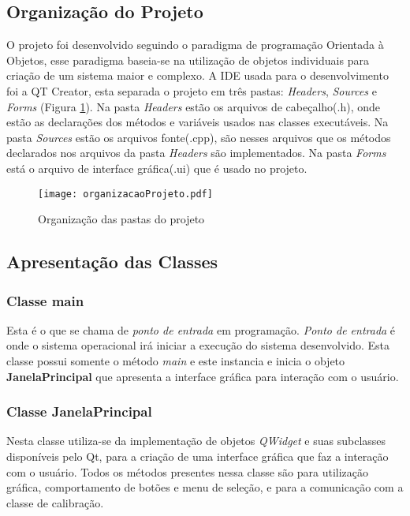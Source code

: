 \subsection{Organização do Projeto}
	 O projeto foi desenvolvido seguindo o paradigma de programação Orientada à Objetos, esse paradigma baseia-se na utilização de objetos individuais para criação de um sistema maior e complexo. A IDE usada para o desenvolvimento foi a QT Creator, esta separada o projeto em três pastas: {\it Headers}, {\it Sources} e {\it Forms} (Figura \ref{fig:OrganizacaoDoProjeto}). Na pasta {\it Headers} estão os arquivos de cabeçalho(.h), onde estão as declarações dos métodos e variáveis usados nas classes  executáveis. Na pasta {\it Sources} estão os arquivos fonte(.cpp), são nesses arquivos que os métodos declarados nos arquivos da pasta {\it Headers} são implementados. Na pasta {\it Forms} está o arquivo de interface gráfica(.ui) que é usado no projeto.
	 
	\begin{figure}[!h]
		\centering
		\texttt{[image: organizacaoProjeto.pdf]}
		\caption{Organização das pastas do projeto}
		\label{fig:OrganizacaoDoProjeto}
	\end{figure}

\subsection{Apresentação das Classes}
\subsubsection{Classe main}
 Esta é o que se chama de \textit{ponto de entrada} em programação. \textit{Ponto de entrada} é onde o sistema operacional irá iniciar a execução do sistema desenvolvido. Esta classe possui somente o método \textit{main} e este instancia e inicia o objeto \textbf{JanelaPrincipal} que apresenta a interface gráfica para interação com o usuário.
 
\subsubsection{Classe JanelaPrincipal}
Nesta classe utiliza-se da implementação de objetos \textit{QWidget} e suas subclasses disponíveis pelo Qt, para a criação de uma interface gráfica que faz a interação com o usuário. Todos os métodos presentes nessa classe são para utilização gráfica, comportamento de botões e menu de seleção, e para a comunicação com a classe de calibração.	

